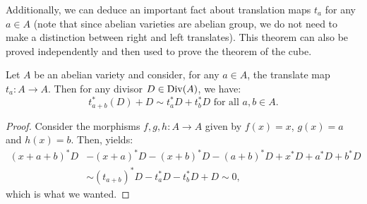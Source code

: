 Additionally, we can deduce an important fact about translation maps $t_a$ for any $a\in A$ (note that since abelian varieties are abelian group, we do not need to make a distinction between right and left translates). This theorem can also be proved independently and then used to prove the theorem of the cube.
\begin{theorem}\label{thmsquare}
	Let $A$ be an abelian variety and consider, for any $a\in A$, the translate map $t_a:A\rightarrow A$. Then for any divisor $D\in\operatorname{Div}(A)$, we have:
	\begin{equation*}
		t_{a+b}^*(D)+D\sim t_a^*D+t_b^*D\text{ for all }a,b\in A.
	\end{equation*}
\end{theorem}
\begin{proof}
	Consider the morphisms $f,g,h:A\rightarrow A$ given by $f(x)=x$, $g(x)=a$ and $h(x)=b$. Then,  yields:
	\begin{align*}
		(x+a+b)^*D&-(x+a)^*D-(x+b)^*D-(a+b)^*D+x^*D+a^*D+b^*D\\
		&\sim (t_{a+b})^*D-t_a^*D-t_b^*D+D\sim 0,
	\end{align*}
	which is what we wanted.
\end{proof}


